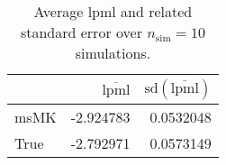 \begin{table}[H]

\caption{Average lpml and related standard error over $n_{\text{sim}} = 10$ simulations.}
\centering
\begin{tabular}[t]{lrr}
\toprule
  & $\overbar{\text{lpml}}$ & $\text{sd}(\overbar{\text{lpml}})$\\
\midrule
msMK & -2.924783 & 0.0532048\\
True & -2.792971 & 0.0573149\\
\bottomrule
\end{tabular}
\end{table}